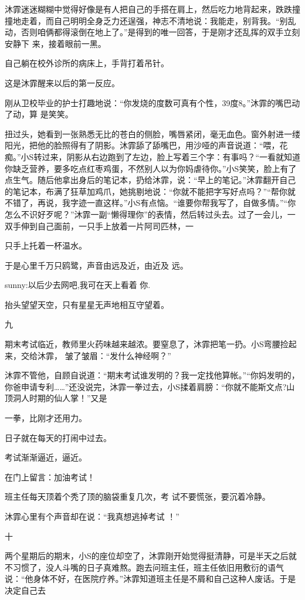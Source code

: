 \documentclass{article}
\begin{document}
沐霏迷迷糊糊中觉得好像是有人把自己的手搭在肩上，然后吃力地背起来，跌跌撞撞地走着，而自己明明全身乏力还逞强，神志不清地说：我能走，别背我。“别乱动，否则咱俩都得滚倒在地上了。”是得到的唯一回答，于是刚才还乱挥的双手立刻安静下
来，接着眼前一黑。 

自己躺在校外诊所的病床上，手背打着吊针。
\newpage



这是沐霏醒来以后的第一反应。 

刚从卫校毕业的护士打趣地说：“你发烧的度数可真有个性，39度8。”沐霏的嘴巴动了动，算
是笑笑。 

扭过头，她看到一张熟悉无比的苍白的侧脸，嘴唇紧闭，毫无血色。窗外射进一缕阳光，把他的脸照得有了阴影。沐霏舔了舔嘴巴，用沙哑的声音说道：“喂，花痴。”小S转过来，阴影从右边跑到了左边，脸上写着三个字：有事吗？“一看就知道你缺乏营养，要多吃点红枣鸡蛋，不然别人以为你妈虐待你。”小S笑笑，脸上有了点生气。随后他拿出身后的笔记本，扔给沐霏，说：“早上的笔记。”沐霏翻开自己的笔记本，布满了狂草加鸡爪，她挑剔地说：“你就不能把字写好点吗？”“帮你就不错了，再说，我字迹一直这样。”小S有点恼。“谁要你帮我写了，自做多情。”“你怎么不识好歹呢？”沐霏一副“懒得理你”的表情，然后转过头去。过了一会儿，一双手伸到自己面前，一只手上放着一片阿司匹林，一
\newpage

只手上托着一杯温水。 

于是心里千万只鸥鹭，声音由远及近，由近及
远。 

sunny:以后少去网吧,我可在天上看着
你. 

抬头望望天空，只有星星无声地相互守望着。
  


九 

期末考试临近，教师里火药味越来越浓。要窒息了，沐霏把笔一扔。小S弯腰捡起来，交给沐霏，
皱了皱眉：“发什么神经啊？” 

沐霏不管他，自顾自说道：“期末考试谁发明的？我一定找他算帐。”“你妈发明的，你爸申请专利……”还没说完，沐霏一拳过去，小S揉着肩膀：“你就不能斯文点?山顶洞人时期的仙人掌！”又是
\newpage

一拳，比刚才还用力。 


日子就在每天的打闹中过去。 


考试渐渐逼近，逼近。 


在门上留言：加油考试！ 

班主任每天顶着个秃了顶的脑袋重复几次，考
试不要慌张，要沉着冷静。 

沐霏心里有个声音却在说：“我真想逃掉考试
！” 


十 

两个星期后的期末，小S的座位却空了，沐霏刚开始觉得挺清静，可是半天之后就不习惯了，没人斗嘴的日子真难熬。跑去问班主任，班主任依旧用敷衍的语气说：“他身体不好，在医院疗养。”沐霏知道班主任是不屑和自己这种人废话。于是决定自己去
\newpage
\end{document}
